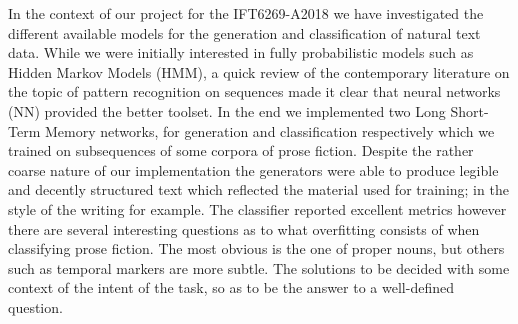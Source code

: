 
In the context of our project for the IFT6269-A2018 we have investigated the
different available models for the generation and classification of natural
text data.  While we were initially interested in fully probabilistic models
such as Hidden Markov Models (HMM), a quick review of the contemporary
literature on the topic of pattern recognition on sequences made it clear that
neural networks (NN) provided the better toolset. In the end we implemented two
Long Short-Term Memory networks, for generation and classification respectively
which we trained on subsequences of some corpora of prose fiction. Despite the
rather coarse nature of our implementation the generators were able to produce
legible and decently structured text which reflected the material used for
training; in the style of the writing for example. The classifier reported 
excellent metrics however there are several interesting questions as to
what overfitting consists of when classifying prose fiction. The most
obvious is the one of proper nouns, but others such as temporal markers
are more subtle. The solutions to be decided with some context of the
intent of the task, so as to be the answer to a well-defined question.

